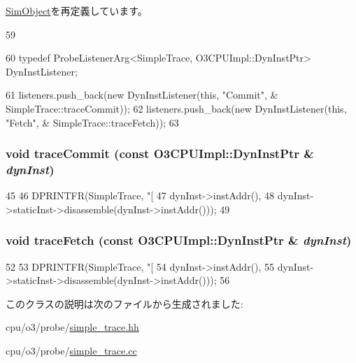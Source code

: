 \hyperlink{classSimObject_aa58a8221691801138d5d9236b8c3e0fb}{SimObject}を再定義しています。


\begin{DoxyCode}
59 {
60     typedef ProbeListenerArg<SimpleTrace, O3CPUImpl::DynInstPtr> DynInstListener;
      
61     listeners.push_back(new DynInstListener(this, "Commit", &
      SimpleTrace::traceCommit));
62     listeners.push_back(new DynInstListener(this, "Fetch", &
      SimpleTrace::traceFetch));
63 }
\end{DoxyCode}
\hypertarget{classSimpleTrace_af37aacf101d574df0198e9d66bf9f024}{
\subsubsection[{traceCommit}]{\setlength{\rightskip}{0pt plus 5cm}void traceCommit (const {\bf O3CPUImpl::DynInstPtr} \& {\em dynInst})}}
\label{classSimpleTrace_af37aacf101d574df0198e9d66bf9f024}



\begin{DoxyCode}
45 {
46     DPRINTFR(SimpleTrace, "[%
47              dynInst->instAddr(),
48              dynInst->staticInst->disassemble(dynInst->instAddr()));
49 }
\end{DoxyCode}
\hypertarget{classSimpleTrace_acef17a0d15cdee9ac15c8aa760ec3070}{
\subsubsection[{traceFetch}]{\setlength{\rightskip}{0pt plus 5cm}void traceFetch (const {\bf O3CPUImpl::DynInstPtr} \& {\em dynInst})}}
\label{classSimpleTrace_acef17a0d15cdee9ac15c8aa760ec3070}



\begin{DoxyCode}
52 {
53     DPRINTFR(SimpleTrace, "[%
54              dynInst->instAddr(),
55              dynInst->staticInst->disassemble(dynInst->instAddr()));
56 }
\end{DoxyCode}


このクラスの説明は次のファイルから生成されました:\begin{DoxyCompactItemize}
\item 
cpu/o3/probe/\hyperlink{simple__trace_8hh}{simple\_\-trace.hh}\item 
cpu/o3/probe/\hyperlink{simple__trace_8cc}{simple\_\-trace.cc}\end{DoxyCompactItemize}
